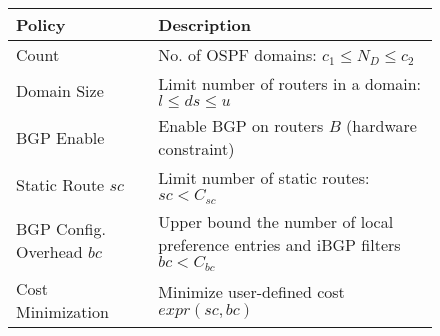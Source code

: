 \begin{figure}
\vspace{-2mm}
\small
\begin{minipage}{\columnwidth}
	\begin{tabular}{m{8em}  m{19em} } 
			{\bf Policy} & {\bf Description} \\ 
			\hline
			Count  & No. of OSPF domains: $c_1\leq N_D\leq c_2$  \\ \hline
			Domain Size  & Limit number of routers in a domain: $l\leq ds\leq u$ \\ \hline
			BGP Enable & Enable BGP on routers $B$ (hardware constraint) \\ \hline
			Static Route ${sc}$ & Limit number of static routes: $sc < C_{sc}$ \\ \hline
			BGP Config. Overhead $bc$ & Upper bound the number of local preference entries and iBGP filters $bc < C_{bc}$ \\ \hline
			Cost Minimization & Minimize user-defined cost $expr(sc, bc)$
		\end{tabular}
				
	\end{minipage}
\label{tab:configpolicysupport}
\end{figure}